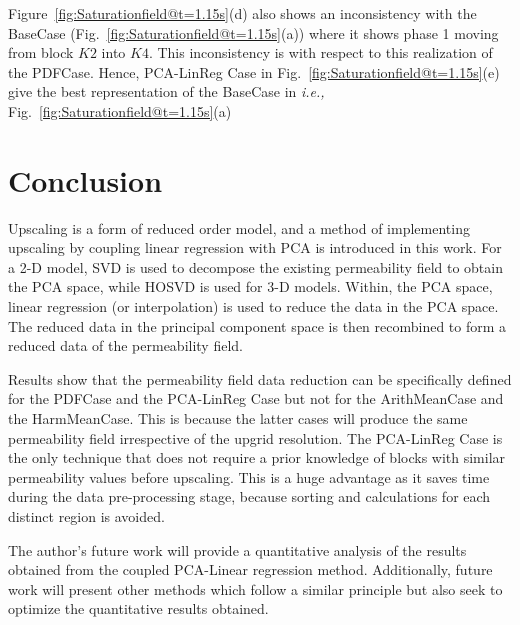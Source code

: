 \documentclass[preprint,12pt]{elsarticle}
\newcommand{\ie}{{\it i.e., }}
\begin{document}
Figure~\ref{fig:Saturationfield@t=1.15s}(d) also shows an inconsistency with the BaseCase (Fig.~\ref{fig:Saturationfield@t=1.15s}(a)) where it shows phase 1 moving from block $K2$ into $K4$. This inconsistency is with respect to this realization of the PDFCase. Hence, PCA-LinReg Case in Fig.~\ref{fig:Saturationfield@t=1.15s}(e) give the best representation of the BaseCase in \ie Fig.~\ref{fig:Saturationfield@t=1.15s}(a)

\section{Conclusion}\label{section:conclusion}

Upscaling is a form of reduced order model, and a method of implementing upscaling by coupling linear regression with PCA is introduced in this work. For a 2-D model, SVD is used to decompose the existing permeability field to obtain the PCA space, while HOSVD is used for 3-D models. Within, the PCA space, linear regression (or interpolation) is used to reduce the data in the PCA space. The reduced data in the principal component space is then recombined to form a reduced data of the permeability field.

Results show that the permeability field data reduction can be specifically defined for the PDFCase and the PCA-LinReg Case but not for the ArithMeanCase and the HarmMeanCase. This is because the latter cases will produce the same permeability field irrespective of the upgrid resolution. The PCA-LinReg Case is the only technique that does not require a prior knowledge of blocks with similar permeability values before upscaling. This is a huge advantage as it saves time during the data pre-processing stage, because sorting and calculations for each distinct region is avoided. 

The author's future work will provide a quantitative analysis of the results obtained from the coupled PCA-Linear regression method. Additionally, future work will present other methods which follow a similar principle but also seek to optimize the quantitative results obtained.



\clearpage 
 
%
%

  
\end{document}
